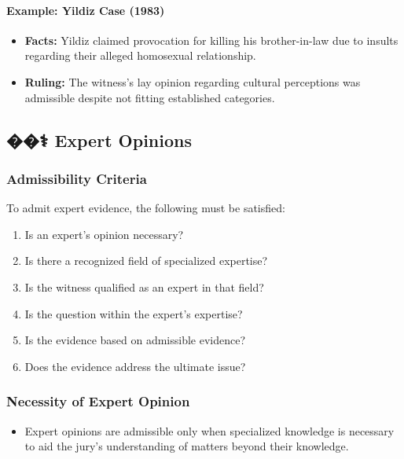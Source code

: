 \paragraph{Example: Yildiz Case (1983)}\label{example-yildiz-case-1983}

\begin{itemize}
\tightlist
\item
  \textbf{Facts:} Yildiz claimed provocation for killing his
  brother-in-law due to insults regarding their alleged homosexual
  relationship.
\item
  \textbf{Ruling:} The witness's lay opinion regarding cultural
  perceptions was admissible despite not fitting established categories.
\end{itemize}

\subsection{��‍⚕️ Expert Opinions}\label{expert-opinions}

\subsubsection{Admissibility Criteria}\label{admissibility-criteria}

To admit expert evidence, the following must be satisfied:

\begin{enumerate}
\def\labelenumi{\arabic{enumi}.}
\tightlist
\item
  Is an expert's opinion necessary?
\item
  Is there a recognized field of specialized expertise?
\item
  Is the witness qualified as an expert in that field?
\item
  Is the question within the expert's expertise?
\item
  Is the evidence based on admissible evidence?
\item
  Does the evidence address the ultimate issue?
\end{enumerate}

\subsubsection{Necessity of Expert
Opinion}\label{necessity-of-expert-opinion}

\begin{itemize}
\tightlist
\item
  Expert opinions are admissible only when specialized knowledge is
  necessary to aid the jury's understanding of matters beyond their
  knowledge.
\end{itemize}

